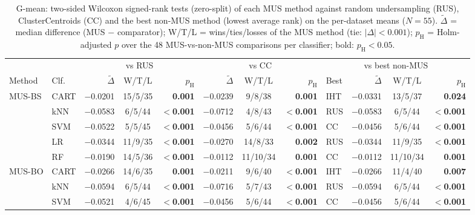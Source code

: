 \begin{table}[!htbp]
\centering
\caption{G-mean: two-sided Wilcoxon signed-rank tests (zero-split) of each MUS method against random undersampling (RUS), ClusterCentroids (CC) and the best non-MUS method (lowest average rank) on the per-dataset means ($N=55$). $\tilde\Delta$ = median difference (MUS $-$ comparator); W/T/L = wins/ties/losses of the MUS method (tie: $|\Delta|<0.001$); $p_\mathrm{H}$ = Holm-adjusted $p$ over the 48 MUS-vs-non-MUS comparisons per classifier; bold: $p_\mathrm{H}<0.05$.}
\label{tab:wilcoxon_gmean}
\scriptsize
\setlength{\tabcolsep}{3pt}
\begin{adjustbox}{max width=\linewidth}
\begin{tabular}{llrcrrcrlrcr}
\toprule
 & & \multicolumn{3}{c}{vs RUS} & \multicolumn{3}{c}{vs CC} & \multicolumn{4}{c}{vs best non-MUS} \\
\cmidrule(lr){3-5}\cmidrule(lr){6-8}\cmidrule(lr){9-12}
Method & Clf. & $\tilde\Delta$ & W/T/L & $p_\mathrm{H}$ & $\tilde\Delta$ & W/T/L & $p_\mathrm{H}$ & Best & $\tilde\Delta$ & W/T/L & $p_\mathrm{H}$ \\
\midrule
MUS-BS & CART & $-$0.0201 & 15/5/35 & \textbf{0.001} & $-$0.0239 & 9/8/38 & \textbf{0.001} & IHT & $-$0.0331 & 13/5/37 & \textbf{0.024} \\
 & kNN & $-$0.0583 & 6/5/44 & \textbf{$<$0.001} & $-$0.0712 & 4/8/43 & \textbf{$<$0.001} & RUS & $-$0.0583 & 6/5/44 & \textbf{$<$0.001} \\
 & SVM & $-$0.0522 & 5/5/45 & \textbf{$<$0.001} & $-$0.0456 & 5/6/44 & \textbf{$<$0.001} & CC & $-$0.0456 & 5/6/44 & \textbf{$<$0.001} \\
 & LR & $-$0.0344 & 11/9/35 & \textbf{$<$0.001} & $-$0.0270 & 14/8/33 & \textbf{0.002} & RUS & $-$0.0344 & 11/9/35 & \textbf{$<$0.001} \\
 & RF & $-$0.0190 & 14/5/36 & \textbf{$<$0.001} & $-$0.0112 & 11/10/34 & \textbf{0.001} & CC & $-$0.0112 & 11/10/34 & \textbf{0.001} \\
\midrule
MUS-BO & CART & $-$0.0266 & 14/6/35 & \textbf{0.001} & $-$0.0211 & 9/6/40 & \textbf{$<$0.001} & IHT & $-$0.0266 & 11/4/40 & \textbf{0.007} \\
 & kNN & $-$0.0594 & 6/5/44 & \textbf{$<$0.001} & $-$0.0716 & 5/7/43 & \textbf{$<$0.001} & RUS & $-$0.0594 & 6/5/44 & \textbf{$<$0.001} \\
 & SVM & $-$0.0521 & 4/6/45 & \textbf{$<$0.001} & $-$0.0456 & 5/6/44 & \textbf{$<$0.001} & CC & $-$0.0456 & 5/6/44 & \textbf{$<$0.001} \\

\end{tabular}
\end{adjustbox}
\end{table}
